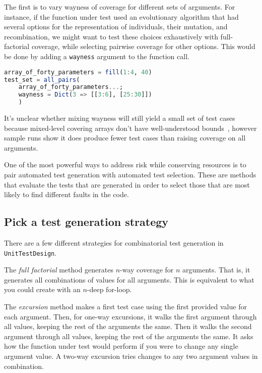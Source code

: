 \documentclass{juliacon}
\newcommand{\utd}{\texttt{UnitTestDesign}\xspace}
\begin{document}
\vskip 6pt
The first is to vary wayness of coverage for different sets of arguments. For instance, if the function under test used an evolutionary algorithm that had several options for the representation of individuals, their mutation, and recombination, we might want to test these choices exhaustively with full-factorial coverage, while selecting pairwise coverage for other options. This would be done by adding a \verb|wayness| argument to the function call.

\begin{lstlisting}[language=Julia]
array_of_forty_parameters = fill(1:4, 40)
test_set = all_pairs(
    array_of_forty_parameters...;
    wayness = Dict(3 => [[3:6], [25:30]])
    )
\end{lstlisting}
It's unclear whether mixing wayness will still yield a small set of test cases because mixed-level covering arrays don't have well-understood bounds~\cite{Cohen2003-pg}, however sample runs show it does produce fewer test cases than raising coverage on all arguments.

\vskip 6pt
One of the most powerful ways to address risk while conserving resources is to pair automated test generation with automated test selection. These are methods that evaluate the tests that are generated in order to select those that are most likely to find different faults in the code.

\subsection{Pick a test generation strategy}

There are a few different strategies for combinatorial test generation in \utd.

\vskip 6pt
The \emph{full factorial} method generates $n$-way coverage for $n$ arguments. That is, it generates all combinations of values for all arguments. This is equivalent to what you could create with an $n$-deep for-loop.

\vskip 6pt
The \emph{excursion} method makes a first test case using the first provided value for each argument. Then, for one-way excursions, it walks the first argument through all values, keeping the rest of the arguments the same. Then it walks the second argument through all values, keeping the rest of the arguments the same. It asks how the function under test would perform if you were to change any single argument value. A two-way excursion tries changes to any two argument values in combination.
\end{document}

